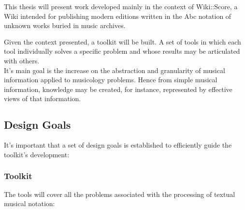 \documentclass[main.tex]{subfiles}
\begin{document}
This thesis will present work developed mainly in the context of Wiki::Score, a Wiki intended for
publishing modern editions written in the Abc notation of unknown works buried in music archives. 

Given the context presented, a toolkit will be built. A set of tools in which each tool individually
solves a specific problem and whose results may be articulated with others.\\
It's main goal is the increase on the abstraction and granularity of musical information applied to
musicology problems. Hence from simple musical information, knowledge may be created, for instance,
represented by effective views of that information.

\subsection{Design Goals}

It's important that a set of design goals is established to efficiently guide the toolkit's
development:

\subsubsection{Toolkit}

The tools will cover all the problems associated with the processing of textual musical notation:
\end{document}
